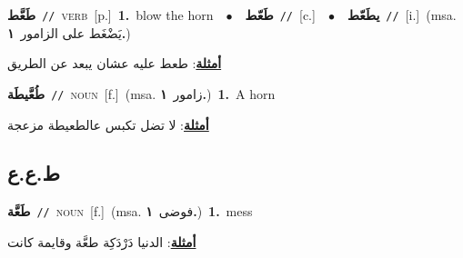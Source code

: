 \documentclass[10pt,a4paper,twoside]{article} %
\begin{document}
\begin{multicols}{2}
{\setlength\topsep{0pt}\textbf{\foreignlanguage{arabic}{طَعَّط}}\ {\color{gray}\texttt{//}\color{black}}\ \textsc{verb}\ [p.]\ \textbf{1.}~blow the horn\ \ $\bullet$\ \ \setlength\topsep{0pt}\textbf{\foreignlanguage{arabic}{طَعّط}}\ {\color{gray}\texttt{//}\color{black}}\ [c.]\ \ $\bullet$\ \ \setlength\topsep{0pt}\textbf{\foreignlanguage{arabic}{يطَعّط}}\ {\color{gray}\texttt{//}\color{black}}\ [i.]\ \color{gray}(msa. \foreignlanguage{arabic}{يَضْغَط على الزامور}~\foreignlanguage{arabic}{\textbf{١.}})\color{black}\  \begin{flushright}\color{gray}\foreignlanguage{arabic}{\textbf{\underline{\foreignlanguage{arabic}{أمثلة}}}: طعط عليه عشان يبعد عن الطريق}\end{flushright}\color{black}} \vspace{2mm}

{\setlength\topsep{0pt}\textbf{\foreignlanguage{arabic}{طُعَّيطَة}}\ {\color{gray}\texttt{//}\color{black}}\ \textsc{noun}\ [f.]\ \color{gray}(msa. \foreignlanguage{arabic}{زامور}~\foreignlanguage{arabic}{\textbf{١.}})\color{black}\ \textbf{1.}~A horn\  \begin{flushright}\color{gray}\foreignlanguage{arabic}{\textbf{\underline{\foreignlanguage{arabic}{أمثلة}}}: لا تضل تكبس عالطعيطة مزعجة}\end{flushright}\color{black}} \vspace{2mm}

\vspace{-3mm}
\subsection*{\color{blue}\foreignlanguage{arabic}{ط.ع.ع}\color{blue}{}} 

{\setlength\topsep{0pt}\textbf{\foreignlanguage{arabic}{طَعَّة}}\ {\color{gray}\texttt{//}\color{black}}\ \textsc{noun}\ [f.]\ \color{gray}(msa. \foreignlanguage{arabic}{فوضى}~\foreignlanguage{arabic}{\textbf{١.}})\color{black}\ \textbf{1.}~mess\  \begin{flushright}\color{gray}\foreignlanguage{arabic}{\textbf{\underline{\foreignlanguage{arabic}{أمثلة}}}: الدنيا دَرْدَكِة طعَّة وقايمة كانت}\end{flushright}\color{black}} \vspace{2mm}


\end{multicols}
\end{document}
